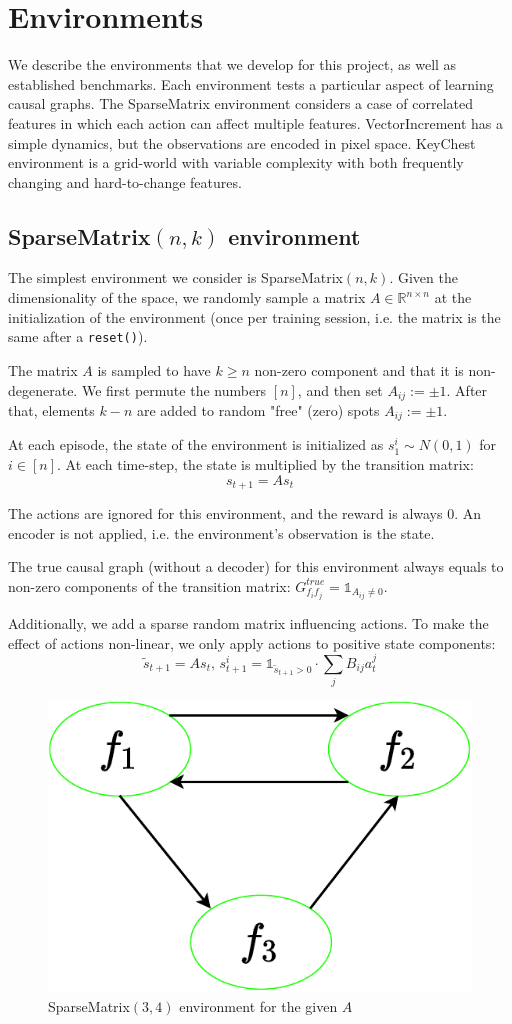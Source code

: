 \documentclass[a4paper,11pt,oneside]{report}
\begin{document}
\section{Environments}
We describe the environments that we develop for this project, as well as established benchmarks. Each environment tests a particular aspect of learning causal graphs. The SparseMatrix environment considers a case of correlated features in which each action can affect multiple features. VectorIncrement has a simple dynamics, but the observations are encoded in pixel space. KeyChest environment is a grid-world with variable complexity with both frequently changing and hard-to-change features.

\subsection{SparseMatrix$(n,k)$ environment}
The simplest environment we consider is SparseMatrix$(n,k)$. Given the dimensionality of the space, we randomly sample a matrix $A\in \mathbb R^{n\times n}$ at the initialization of the environment (once per training session, i.e. the matrix is the same after a {\tt reset()}).

The matrix $A$ is sampled to have $k\geq n$ non-zero component and that it is non-degenerate. We first permute the numbers $[n]$, and then set $A_{ij}:=\pm 1$.
After that, elements $k-n$ are added to random "free" (zero) spots $A_{ij}:=\pm 1$.

At each episode, the state of the environment is initialized as $s_1^i\sim N(0,1)$ for $i\in[n]$. At each time-step, the state is multiplied by the transition matrix:
$$
s_{t+1}=As_t
$$

The actions are ignored for this environment, and the reward is always $0$. An encoder is not applied, i.e. the environment's observation is the state.

The true causal graph (without a decoder) for this environment always equals to non-zero components of the transition matrix: $G^{true}_{f_if_j}=\mathds 1_{A_{ij}\neq 0}$.

Additionally, we add a sparse random matrix influencing actions. To make the effect of actions non-linear, we only apply actions to positive state components:
$$
\tilde{s}_{t+1}=As_t,\, s^i_{t+1}=\mathds 1_{\tilde{s}_{t+1}>0}\cdot \sum\limits_j B_{ij}a_t^j
$$

\begin{figure}[h]
    \centering
    \includegraphics[width=0.4\linewidth]{diagrams/env_true_sm3}
    \caption{SparseMatrix$(3, 4)$ environment for the given $A$}
    \label{fig:envtruesm3}
\end{figure}
\end{document}
